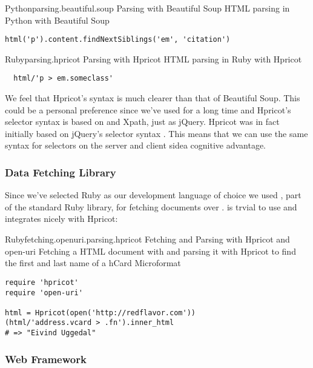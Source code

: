 \begin{scode}{Python}{parsing.beautiful.soup}{%
  Parsing with Beautiful Soup}{%
  HTML parsing in Python with Beautiful Soup}
\begin{lstlisting}
html('p').content.findNextSiblings('em', 'citation')
\end{lstlisting}
\end{scode}

\begin{scode}{Ruby}{parsing.hpricot}{%
  Parsing with Hpricot}{%
  HTML parsing in Ruby with Hpricot}
\begin{lstlisting}
  html/'p > em.someclass'
\end{lstlisting}
\end{scode}

We feel that Hpricot's syntax is much clearer than that of Beautiful Soup.
This could be a personal preference since we've used  for a long
time and Hpricot's selector syntax is based on  and Xpath, just as
jQuery. Hpricot was in fact initially based on jQuery's selector syntax
\citep{why06}. This means that we can use the same syntax for selectors on the
server and client side\emph{}a cognitive advantage.

\subsubsection{Data Fetching Library}

Since we've selected Ruby as our development language of choice we used
, part of the standard Ruby library, for fetching
documents over %
.
 is trvial to use and integrates nicely with Hpricot:

\begin{scode}{Ruby}{fetching.openuri.parsing.hpricot}{%
  Fetching and Parsing with Hpricot and open-uri}{%
  Fetching a HTML document with 
  and parsing it with Hpricot to find the first and
  last name of a hCard Microformat}
\begin{lstlisting}
require 'hpricot'
require 'open-uri'

html = Hpricot(open('http://redflavor.com'))
(html/'address.vcard > .fn').inner_html
# => "Eivind Uggedal"
\end{lstlisting}
\end{scode}


\subsubsection{ Web Framework}

